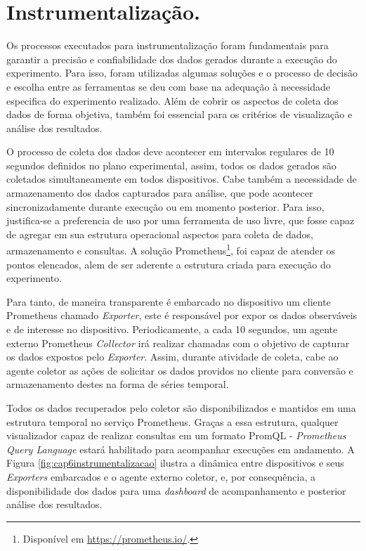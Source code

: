 \section{Instrumentalização.}
\label{cap6:instrumentalizacao}
Os processos executados para instrumentalização foram fundamentais para garantir a precisão e confiabilidade dos dados gerados durante a execução do experimento. Para isso, foram utilizadas algumas soluções e o processo de decisão e escolha entre as ferramentas se deu com base na adequação à necessidade especifica do experimento realizado. Além de cobrir os aspectos de coleta dos dados de forma objetiva, também foi essencial para os critérios de visualização e análise dos resultados.

O processo de coleta dos dados deve acontecer em intervalos regulares de 10 segundos definidos no plano experimental, assim, todos os dados gerados são coletados simultaneamente em todos dispositivos. Cabe também a necessidade de armazenamento dos dados capturados para análise, que pode acontecer sincronizadamente durante execução ou em momento posterior. Para isso, justifica-se a preferencia de uso por uma ferramenta de uso livre, que fosse capaz de agregar em sua estrutura operacional aspectos para coleta de dados, armazenamento e consultas. A solução Prometheus\footnote{Disponível em \url{https://prometheus.io/}.}, foi capaz de atender os pontos elencados, alem de ser aderente a estrutura criada para execução do experimento.

Para tanto, de maneira transparente é embarcado no dispositivo um cliente Prometheus chamado \textit{Exporter}, este é responsável por expor os dados observáveis e de interesse no dispositivo. Periodicamente, a cada 10 segundos, um agente externo Prometheus \textit{Collector} irá realizar chamadas com o objetivo de capturar os dados expostos pelo \textit{Exporter}. Assim, durante atividade de coleta, cabe ao agente coletor as ações de solicitar os dados providos no cliente para conversão e armazenamento destes na forma de séries temporal. 

Todos os dados recuperados pelo coletor são disponibilizados e mantidos em uma estrutura temporal no serviço Prometheus. Graças a essa estrutura, qualquer visualizador capaz de realizar consultas em um formato PromQL - \textit{Prometheus Query Language} estará habilitado para acompanhar execuções em andamento. A Figura \ref{fig:cap6instrumentalizacao} ilustra a dinâmica entre dispositivos e seus \textit{Exporters} embarcados e o agente externo coletor, e, por consequência, a disponibilidade dos dados para uma \textit{dashboard} de acompanhamento e posterior análise dos resultados. 

